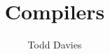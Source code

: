 \newcommand{\coursename}{Compilers}
\newcommand{\coursecode}{COMP36512}
\newcommand{\courseinfo}{}
\newcommand{\Author}{Todd Davies} 
\newcommand{\Title}{Compilers}
\author{\Author}
\title{\Title}

\newcommand\commit{%
  \ifdefined\commitId
    Commit: \texttt{\commitId}
  \fi
}
\newcommand\build{%
  \ifdefined\buildId
    Build: \texttt{\buildId}
  \fi
}